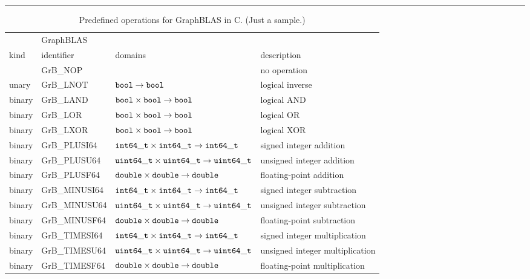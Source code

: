 \begin{table}
\hrule
\begin{center}
\caption{Predefined operations for GraphBLAS in C. (Just a sample.)
}
\label{Tab:PredefinedOperations}
\begin{tabular}{l|l|l|l}
		& GraphBLAS		&									& \\
kind		& identifier 		& domains								& description \\ \hline
		& {\sf GrB\_NOP}	& 									& no operation \\
unary		& {\sf GrB\_LNOT}	& ${\tt bool} \rightarrow {\tt bool}$      				& logical inverse \\
binary		& {\sf GrB\_LAND}	& ${\tt bool} \times {\tt bool} \rightarrow {\tt bool}$      		& logical AND \\
binary		& {\sf GrB\_LOR}	& ${\tt bool} \times {\tt bool} \rightarrow {\tt bool}$      		& logical OR \\
binary		& {\sf GrB\_LXOR}	& ${\tt bool} \times {\tt bool} \rightarrow {\tt bool}$      		& logical XOR \\
binary		& {\sf GrB\_PLUSI64}	& ${\tt int64\_t} \times {\tt int64\_t} \rightarrow {\tt int64\_t}$ 	& signed integer addition \\
binary		& {\sf GrB\_PLUSU64}	& ${\tt uint64\_t} \times {\tt uint64\_t} \rightarrow {\tt uint64\_t}$ 	& unsigned integer addition \\
binary		& {\sf GrB\_PLUSF64}	& ${\tt double} \times {\tt double} \rightarrow {\tt double}$ 		& floating-point addition \\
binary		& {\sf GrB\_MINUSI64}	& ${\tt int64\_t} \times {\tt int64\_t} \rightarrow {\tt int64\_t}$ 	& signed integer subtraction \\
binary		& {\sf GrB\_MINUSU64}	& ${\tt uint64\_t} \times {\tt uint64\_t} \rightarrow {\tt uint64\_t}$ 	& unsigned integer subtraction \\
binary		& {\sf GrB\_MINUSF64}	& ${\tt double} \times {\tt double} \rightarrow {\tt double}$ 		& floating-point subtraction \\
binary		& {\sf GrB\_TIMESI64}	& ${\tt int64\_t} \times {\tt int64\_t} \rightarrow {\tt int64\_t}$ 	& signed integer multiplication \\
binary		& {\sf GrB\_TIMESU64}	& ${\tt uint64\_t} \times {\tt uint64\_t} \rightarrow {\tt uint64\_t}$ 	& unsigned integer multiplication \\
binary		& {\sf GrB\_TIMESF64}	& ${\tt double} \times {\tt double} \rightarrow {\tt double}$ 		& floating-point multiplication \\

\end{tabular}
\end{center}
\end{table}
